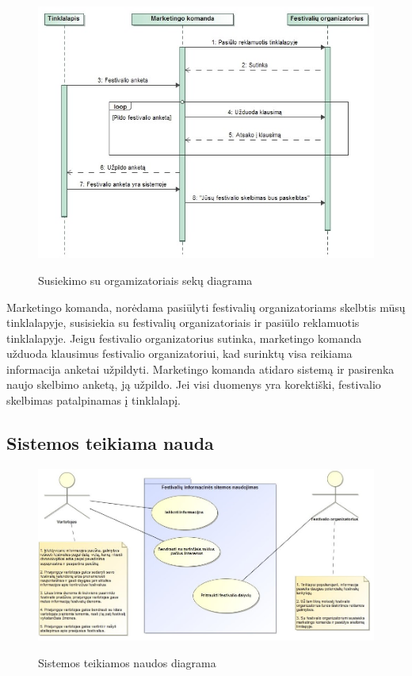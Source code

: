 \documentclass{VUMIFPSkursinis}
\begin{document}
\begin{figure}[H]
    \centering
    \includegraphics[scale=0.7]{img/geri/markIesko}
    \label{img:uml27}
	\caption{Susiekimo su orgamizatoriais sekų diagrama}
\end{figure}

Marketingo komanda, norėdama pasiūlyti festivalių organizatoriams skelbtis mūsų tinklalapyje, susisiekia su festivalių organizatoriais ir pasiūlo reklamuotis tinklalapyje. Jeigu festivalio organizatorius sutinka, marketingo komanda užduoda klausimus festivalio organizatoriui, kad surinktų visa reikiama informacija anketai užpildyti. Marketingo komanda atidaro sistemą ir pasirenka naujo skelbimo anketą, ją užpildo. Jei visi duomenys yra korektiški, festivalio skelbimas patalpinamas į tinklalapį.

\subsection{Sistemos teikiama nauda}

\begin{figure}[H]
    \centering
    \includegraphics[scale=0.5]{img/geri/sisNauda}
    \label{img:uml28}
	\caption{Sistemos teikiamos naudos diagrama}
\end{figure}
\end{document}
